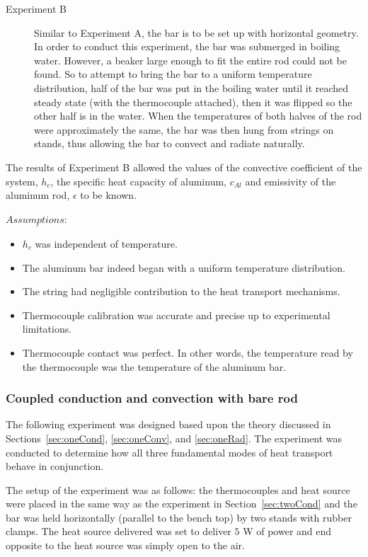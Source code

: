 \documentclass[10pt,aps,prb,twocolumn, nofootinbib]{revtex4-1}
\begin{document}
\begin{description}
\item[Experiment B] Similar to Experiment A, the bar is to be set up with horizontal geometry. In order to conduct this experiment, the bar was submerged in boiling water. However, a beaker large enough to fit the entire rod could not be found. So to attempt to bring the bar to a uniform temperature distribution, half of the bar was put in the boiling water until it reached steady state (with the thermocouple attached), then it was flipped so the other half is in the water. When the temperatures of both halves of the rod were approximately the same, the bar was then hung from strings on stands, thus allowing the bar to convect and radiate naturally. 
\end{description}
The results of Experiment B allowed the values of the convective coefficient of the system, $h_c$, the specific heat capacity of aluminum, $c_{Al}$ and emissivity of the aluminum rod, $\epsilon$ to be known. 

\bigskip
 \noindent $\underline{Assumptions:}$
 
 \begin{itemize}\parskip0pt
     	\item $h_c$ was independent of temperature.
     	\medskip
     	\item The aluminum bar indeed began with a uniform temperature distribution.
     	\medskip
     	\item The string had negligible contribution to the heat transport mechanisms.
     	\item Thermocouple calibration was accurate and precise up to experimental limitations.
     	\medskip
     	\item Thermocouple contact was perfect. In other words, the temperature read by the thermocouple was the temperature of the aluminum bar.
 \end{itemize} 

\subsubsection{\label{sec:twoAllbare} Coupled conduction and convection with bare rod}
The following experiment was designed based upon the theory discussed in Sections~\ref{sec:oneCond}, \ref{sec:oneConv}, and \ref{sec:oneRad}. The experiment was conducted to determine how all three fundamental modes of heat transport behave in conjunction.

The setup of the experiment was as follows: the thermocouples and heat source were placed in the same way as the experiment in Section~\ref{sec:twoCond} and the bar was held horizontally (parallel to the bench top) by two stands with rubber clamps. The heat source delivered was set to deliver $5$ W of power and end opposite to the heat source was simply open to the air.
\end{document}
